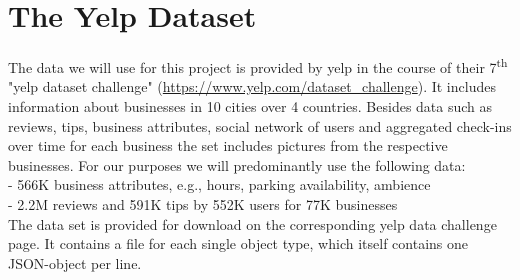 \section{The Yelp Dataset} %
\label{cha:yelp}
The data we will use for this project is provided by yelp in the course of their 7\textsuperscript{th} "yelp dataset challenge" (\url{https://www.yelp.com/dataset_challenge}). %
It includes information about businesses in 10 cities over 4 countries. Besides data such as reviews, tips, business attributes, social network of users and aggregated check-ins over time for each business the set includes pictures from the respective businesses. For our purposes we will predominantly use the following data: \\
   - 	566K business attributes, e.g., hours, parking availability, ambience\\
   - 	2.2M reviews and 591K tips by 552K users for 77K businesses\\
The data set is provided for download on the corresponding yelp data challenge page. It contains a file for each single object type, which itself contains one JSON-object per line. %
